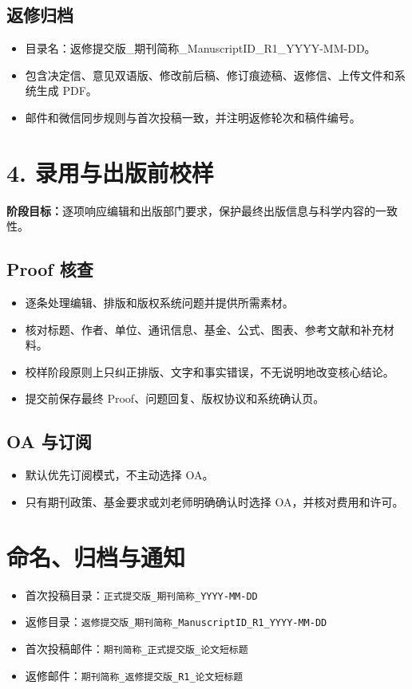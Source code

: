 \documentclass[UTF8,11pt]{ctexart}
\begin{document}
\subsection{返修归档}
\begin{itemize}
\item 目录名：返修提交版\_期刊简称\_ManuscriptID\_R1\_YYYY-MM-DD。
\item 包含决定信、意见双语版、修改前后稿、修订痕迹稿、返修信、上传文件和系统生成 PDF。
\item 邮件和微信同步规则与首次投稿一致，并注明返修轮次和稿件编号。
\end{itemize}
\section{4. 录用与出版前校样}
\textbf{阶段目标：}逐项响应编辑和出版部门要求，保护最终出版信息与科学内容的一致性。
\subsection{Proof 核查}
\begin{itemize}
\item 逐条处理编辑、排版和版权系统问题并提供所需素材。
\item 核对标题、作者、单位、通讯信息、基金、公式、图表、参考文献和补充材料。
\item 校样阶段原则上只纠正排版、文字和事实错误，不无说明地改变核心结论。
\item 提交前保存最终 Proof、问题回复、版权协议和系统确认页。
\end{itemize}
\subsection{OA 与订阅}
\begin{itemize}
\item 默认优先订阅模式，不主动选择 OA。
\item 只有期刊政策、基金要求或刘老师明确确认时选择 OA，并核对费用和许可。
\end{itemize}
\section{命名、归档与通知}
\begin{itemize}
\item 首次投稿目录：\texttt{正式提交版\_期刊简称\_YYYY-MM-DD}
\item 返修目录：\texttt{返修提交版\_期刊简称\_ManuscriptID\_R1\_YYYY-MM-DD}
\item 首次投稿邮件：\texttt{期刊简称\_正式提交版\_论文短标题}
\item 返修邮件：\texttt{期刊简称\_返修提交版\_R1\_论文短标题}
\end{itemize}
\end{document}
